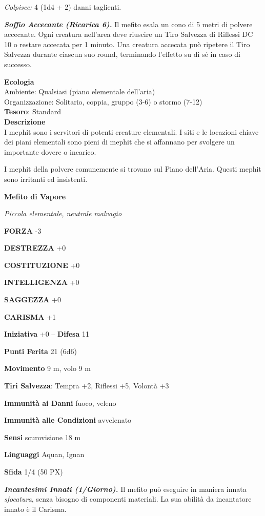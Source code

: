 \begin{multicols}{2}
	\textit{Colpisce:} 4 (1d4 + 2) danni taglienti.

	\textit{\textbf{Soffio Accecante (Ricarica 6).}} Il mefito esala un cono di 5 metri di polvere accecante. Ogni creatura nell'area deve riuscire un Tiro Salvezza di Riflessi DC 10 o restare accecata per 1 minuto. Una creatura accecata può ripetere il Tiro Salvezza durante ciascun suo round, terminando l'effetto su di sé in caso di successo.

	\textbf{Ecologia}\\
	Ambiente: Qualsiasi (piano elementale dell'aria)\\
	Organizzazione: Solitario, coppia, gruppo (3-6) o stormo (7-12)\\
	\textbf{Tesoro}: Standard\\
	\textbf{Descrizione}\\
	I mephit sono i servitori di potenti creature elementali. I siti e le locazioni chiave dei piani elementali sono pieni di mephit che si affannano per svolgere un importante dovere o incarico.

	I mephit della polvere comunemente si trovano sul Piano dell'Aria. Questi mephit sono irritanti ed insistenti.

	\medskip{}\textbf{Mefito di Vapore}

	\textit{Piccola elementale, neutrale malvagio}

	\textbf{FORZA} -3

	\textbf{DESTREZZA} +0

	\textbf{COSTITUZIONE} +0

	\textbf{INTELLIGENZA} +0

	\textbf{SAGGEZZA} +0

	\textbf{CARISMA} +1

	\textbf{Iniziativa} +0 -- \textbf{Difesa} 11

	\textbf{Punti Ferita} 21 (6d6)

	\textbf{Movimento} 9 m, volo 9 m

	\textbf{Tiri Salvezza}: Tempra +2, Riflessi +5, Volontà +3

	\textbf{Immunità ai Danni} fuoco, veleno

	\textbf{Immunità alle Condizioni} avvelenato

	\textbf{Sensi} scurovisione 18 m

	\textbf{Linguaggi} Aquan, Ignan

	\textbf{Sfida} 1/4 (50 PX)

	\textit{\textbf{Incantesimi Innati (1/Giorno).}} Il mefito può eseguire in maniera innata \textit{sfocatura}, senza bisogno di componenti materiali. La sua abilità da incantatore innato è il Carisma.


\end{multicols}
